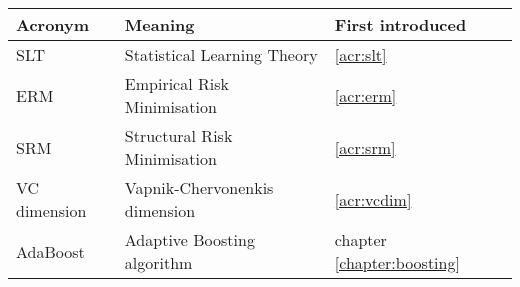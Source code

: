 \begin{tabular}{l l l}

\bf{Acronym} & \bf{Meaning} & \bf{First introduced} \\ \hline \hline

SLT	& Statistical Learning Theory 	& \ref{acr:slt} \\
ERM	& Empirical Risk Minimisation 	& \ref{acr:erm} \\
SRM	& Structural Risk Minimisation & \ref{acr:srm} \\
VC dimension & Vapnik-Chervonenkis dimension & \ref{acr:vcdim} \\
AdaBoost & Adaptive Boosting algorithm	& chapter \ref{chapter:boosting} \\
\hline

\end{tabular}

